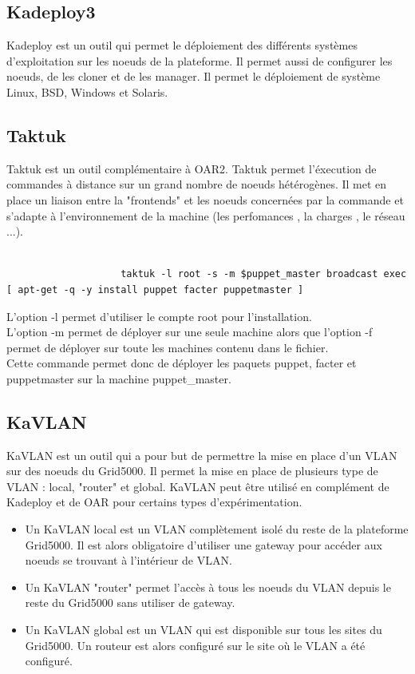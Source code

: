 \documentclass[a4paper, 10pt, onecolumn]{report}
\begin{document}
		\subsection{Kadeploy3}
			Kadeploy est un outil qui permet le déploiement des différents systèmes d'exploitation sur les noeuds de la plateforme. Il permet aussi de configurer les noeuds, de les cloner et de les manager. Il permet le déploiement de système Linux, BSD, Windows et Solaris.
		\subsection{Taktuk}
			Taktuk est un outil complémentaire à OAR2. Taktuk permet l'éxecution de commandes à distance sur un grand nombre de noeuds hétérogènes. Il met en place un liaison entre la "frontends" et les noeuds concernées par la commande et s'adapte  à l'environnement de la machine (les perfomances , la charges , le réseau ...). \\
			\\ 
			\begin{lstlisting}
					taktuk -l root -s -m $puppet_master broadcast exec [ apt-get -q -y install puppet facter puppetmaster ]
			\end{lstlisting}
			L'option -l permet d'utiliser le compte root pour l'installation.\\
			L'option -m permet de déployer sur une seule machine alors que l'option -f permet de déployer sur toute les machines contenu dans le fichier.\\
			Cette commande permet donc de déployer les paquets puppet, facter et puppetmaster sur la machine puppet\_master.
			
		\subsection{KaVLAN}
			KaVLAN est un outil qui a pour but de permettre la mise en place d'un VLAN sur des noeuds du Grid5000. Il permet la mise en place de plusieurs type de VLAN : local, "router" et global. KaVLAN peut être utilisé en complément de Kadeploy et de OAR pour certains types d'expérimentation.\\
			\begin{itemize}
  				\item Un KaVLAN local est un VLAN complètement isolé du reste de la plateforme Grid5000. Il est alors obligatoire d'utiliser une gateway pour accéder aux noeuds se trouvant à l'intérieur de VLAN.
  				\item Un KaVLAN "router" permet l'accès à tous les noeuds du VLAN depuis le reste du Grid5000 sans utiliser de gateway.
 				 \item Un KaVLAN global est un VLAN qui est disponible sur tous les sites du Grid5000. Un routeur est alors configuré sur le site où le VLAN a été configuré.
			\end{itemize}
			
\end{document}
